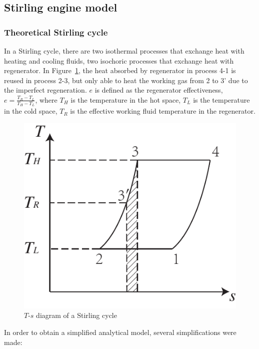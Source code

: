 \subsection{Stirling engine model\label{sec:StirlingEngineModel}}
\subsubsection{Theoretical Stirling cycle}
In a Stirling cycle, there are two isothermal processes that exchange heat with heating and cooling fluids, two isochoric processes that exchange heat with regenerator. In Figure~\ref{fig:StirlingCycle}, the heat absorbed by regenerator in process 4-1 is reused in process 2-3, but only able to heat the working gas from 2 to 3' due to the imperfect regeneration. $e$ is defined as the regenerator effectiveness\cite{Formosa2010,Juhasz2010}, $e=\frac{T_R-T_L}{T_H-T_L}$, where $T_H$ is the temperature in the hot space, $T_L$ is the temperature in the cold space, $T_R$ is the effective working fluid temperature in the regenerator.

\noindent \begin{figure}[htbp]
\begin{center}
	\includegraphics[width = 0.7\columnwidth]{./fig/StirlingCycle}
	\caption{$T$-$s$ diagram of a Stirling cycle}
	\label{fig:StirlingCycle}
\end{center}
\end{figure}

In order to obtain a simplified analytical model, several simplifications were made:

